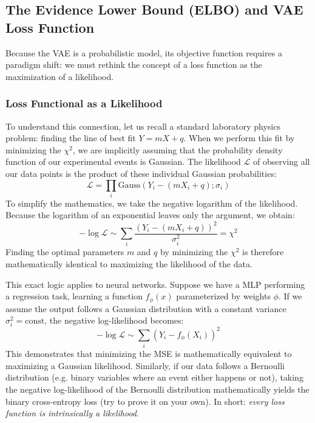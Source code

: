 \subsection{The Evidence Lower Bound (ELBO) and VAE Loss Function}

Because the VAE is a probabilistic model, its objective function requires a paradigm shift: we must rethink the concept of a loss function as the maximization of a likelihood. 

\subsubsection{Loss Functional as a Likelihood}
To understand this connection, let us recall a standard laboratory physics problem: finding the line of best fit $Y = mX + q$. When we perform this fit by minimizing the $\chi^2$, we are implicitly assuming that the probability density function of our experimental events is Gaussian. The likelihood $\mathcal{L}$ of observing all our data points is the product of these individual Gaussian probabilities:
\begin{equation*}
    \mathcal{L} = \prod_i \text{Gauss}(Y_i - (mX_i + q); \sigma_i)
\end{equation*}
To simplify the mathematics, we take the negative logarithm of the likelihood. Because the logarithm of an exponential leaves only the argument, we obtain:
\begin{equation*}
    -\log \mathcal{L} \sim \sum_i \frac{(Y_i - (mX_i + q))^2}{\sigma_i^2} = \chi^2
\end{equation*}
Finding the optimal parameters $m$ and $q$ by minimizing the $\chi^2$ is therefore mathematically identical to maximizing the likelihood of the data.

This exact logic applies to neural networks. Suppose we have a MLP performing a regression task, learning a function $f_\phi(x)$ parameterized by weights $\phi$. If we assume the output follows a Gaussian distribution with a constant variance $\sigma_i^2 = \text{const}$, the negative log-likelihood becomes:
\begin{equation*}
    -\log \mathcal{L} \sim \sum_i (Y_i - f_\phi(X_i))^2
\end{equation*}
This demonstrates that minimizing the MSE is mathematically equivalent to maximizing a Gaussian likelihood. Similarly, if our data follows a Bernoulli distribution (e.g. binary variables where an event either happens or not), taking the negative log-likelihood of the Bernoulli distribution mathematically yields the binary cross-entropy loss (try to prove it on your own). In short: \textit{every loss function is intrinsically a likelihood}.

